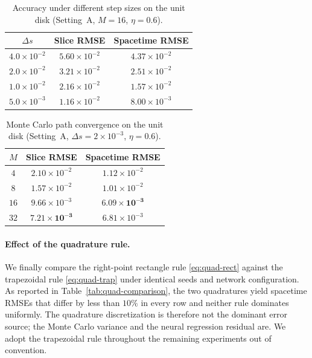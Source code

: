 \documentclass[a4paper,fleqn]{cas-sc}
\begin{document}
\begin{table}[pos=htbp]
\centering
\caption{Accuracy under different step sizes on the unit disk (Setting~A, $M=16$, $\eta=0.6$).}
\label{tab:conv-ds}
\begin{tabular}{ccc}
\toprule
$\Delta s$ & Slice RMSE & Spacetime RMSE \\
\midrule
$4.0\times 10^{-2}$ & $5.60\times 10^{-2}$ & $4.37\times 10^{-2}$ \\
$2.0\times 10^{-2}$ & $3.21\times 10^{-2}$ & $2.51\times 10^{-2}$ \\
$1.0\times 10^{-2}$ & $2.16\times 10^{-2}$ & $1.57\times 10^{-2}$ \\
$5.0\times 10^{-3}$ & $1.16\times 10^{-2}$ & $8.00\times 10^{-3}$ \\
\bottomrule
\end{tabular}
\end{table}

\begin{table}[pos=htbp]
\centering
\caption{Monte Carlo path convergence on the unit disk (Setting~A, $\Delta s = 2\times 10^{-3}$, $\eta=0.6$).}
\label{tab:conv-mc}
\begin{tabular}{ccc}
\toprule
$M$ & Slice RMSE & Spacetime RMSE \\
\midrule
$4$  & $2.10\times 10^{-2}$ & $1.12\times 10^{-2}$ \\
$8$  & $1.57\times 10^{-2}$ & $1.01\times 10^{-2}$ \\
$16$ & $9.66\times 10^{-3}$ & $\mathbf{6.09\times 10^{-3}}$ \\
$32$ & $\mathbf{7.21\times 10^{-3}}$ & $6.81\times 10^{-3}$ \\
\bottomrule
\end{tabular}
\end{table}

\paragraph{Effect of the quadrature rule.}
We finally compare the right-point rectangle rule \eqref{eq:quad-rect}
against the trapezoidal rule \eqref{eq:quad-trap} under identical seeds and
network configuration. As reported in Table~\ref{tab:quad-comparison}, the
two quadratures yield spacetime RMSEs that differ by less than $10\%$ in
every row and neither rule dominates uniformly. The quadrature discretization
is therefore not the dominant error source; the Monte Carlo variance and the
neural regression residual are. We adopt the trapezoidal rule throughout the
remaining experiments out of convention.
\end{document}

